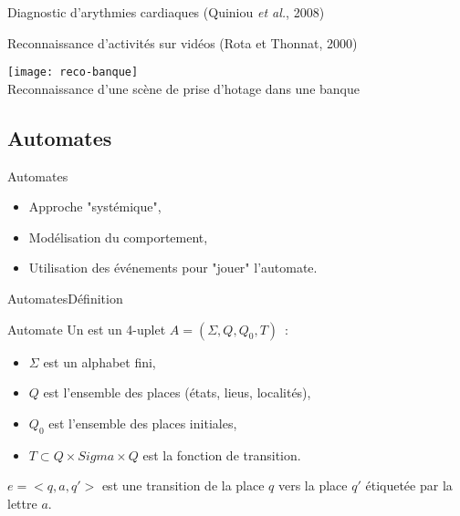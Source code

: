 \documentclass[compress]{beamer}
\begin{document}
\begin{frame}{Diagnostic d'arythmies cardiaques (Quiniou {\it et al.}, 2008)}
\begin{center}
\end{center}
\end{frame}

\begin{frame}{Reconnaissance d'activités sur vidéos (Rota et Thonnat, 2000)}
\begin{center}
\texttt{[image: reco-banque]}\\
\small Reconnaissance d'une scène de prise d'hotage dans une banque
\end{center}
\end{frame}

\subsection{Automates}
\begin{frame}{Automates}
\begin{itemize}
\item Approche "systémique",
\item Modélisation du comportement,
\item Utilisation des événements pour "jouer" l'automate.
\end{itemize}
\end{frame}

\begin{frame}{Automates}{Définition}
\begin{block}{Automate}
Un  est un 4-uplet $A=(\Sigma, Q, Q_0, T)$~:
\begin{itemize}
\item $\Sigma$ est un alphabet fini,
\item $Q$ est l'ensemble des places (états, lieus, localités),
\item $Q_0$ est l'ensemble des places initiales,
\item $T \subset Q \times Sigma \times Q$ est la fonction de transition.
\end{itemize}
$e = <q, a, q'>$ est une transition de la place $q$ vers la place $q'$ étiquetée par la lettre $a$.
\end{block}
\end{frame}
\end{document}
